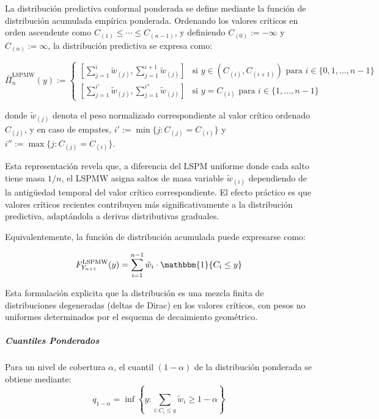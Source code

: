 La distribución predictiva conformal ponderada se define mediante la función de distribución acumulada empírica ponderada. Ordenando los valores críticos en orden ascendente como $C_{(1)} \leq \cdots \leq C_{(n-1)}$, y definiendo $C_{(0)} := -\infty$ y $C_{(n)} := \infty$, la distribución predictiva se expresa como:

\begin{equation}
    \bar{\Pi}_n^{\text{LSPMW}}(y) := 
    \begin{cases}
        \left[\sum_{j=1}^{i} \tilde{w}_{(j)}, \sum_{j=1}^{i+1} \tilde{w}_{(j)}\right] & \text{si } y \in (C_{(i)}, C_{(i+1)}) \text{ para } i \in \{0, 1, \ldots, n-1\} \\
        \left[\sum_{j=1}^{i'} \tilde{w}_{(j)}, \sum_{j=1}^{i''} \tilde{w}_{(j)}\right] & \text{si } y = C_{(i)} \text{ para } i \in \{1, \ldots, n-1\}
    \end{cases}
    \label{eq:lspmw_predictive_dist}
\end{equation}

donde $\tilde{w}_{(j)}$ denota el peso normalizado correspondiente al valor crítico ordenado $C_{(j)}$, y en caso de empates, $i' := \min\{j : C_{(j)} = C_{(i)}\}$ y $i'' := \max\{j : C_{(j)} = C_{(i)}\}$.

Esta representación revela que, a diferencia del LSPM uniforme donde cada salto tiene masa $1/n$, el LSPMW asigna saltos de masa variable $\tilde{w}_{(i)}$ dependiendo de la antigüedad temporal del valor crítico correspondiente. El efecto práctico es que valores críticos recientes contribuyen más significativamente a la distribución predictiva, adaptándola a derivas distributivas graduales.

Equivalentemente, la función de distribución acumulada puede expresarse como:

\begin{equation}
F_{Y_{n+1}}^{\text{LSPMW}}(y) = \sum_{i=1}^{n-1} \tilde{w}_i \cdot \mathbbm{1}\{C_i \leq y\}
\label{eq:lspmw_cdf}
\end{equation}

Esta formulación explicita que la distribución es una mezcla finita de distribuciones degeneradas (deltas de Dirac) en los valores críticos, con pesos no uniformes determinados por el esquema de decaimiento geométrico.

\subparagraph{Cuantiles Ponderados}
Para un nivel de cobertura $\alpha$, el cuantil $(1-\alpha)$ de la distribución ponderada se obtiene mediante:
\begin{equation}
q_{1-\alpha} = \inf\left\{y : \sum_{i: C_i \leq y} \tilde{w}_i \geq 1-\alpha\right\}
\end{equation}

